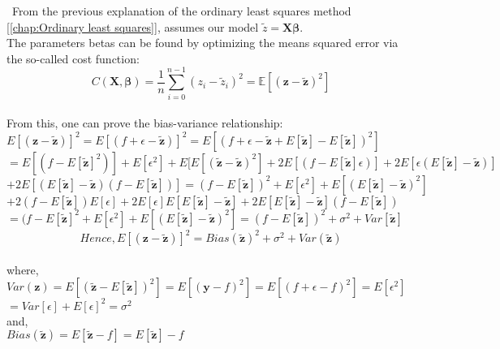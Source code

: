 \quad \, From the previous explanation of the ordinary least squares method [\ref{chap:Ordinary least squares}], assumes our model $\tilde{z} = \textbf{X}\boldsymbol{\beta}$. \\

The parameters betas can be found by optimizing the means squared error via the so-called cost function: \\

$$C(\boldsymbol{X},\boldsymbol{\beta}) =\frac{1}{n}\sum_{i=0}^{n-1}(z_i-\tilde{z}_i)^2=\mathbb{E}\left[(\boldsymbol{z}-\boldsymbol{\tilde{z}})^2\right]$$ \\

From this, one can prove the bias-variance relationship: \\

$E[(\boldsymbol{z} - \boldsymbol{\tilde{z}})]^{2} = E[(f + \epsilon - \boldsymbol{\tilde{z}})]^{2} = E[(f + \epsilon - \boldsymbol{\tilde{z}} + E[\boldsymbol{\tilde{z}}] - E[\boldsymbol{\tilde{z}}])^{2}]$ \\

$= E[(f - E[\boldsymbol{\tilde{z}}]^{2})] + E[\epsilon^{2}] + E[E[(\boldsymbol{\tilde{z}} - \boldsymbol{\tilde{z}})^{2}] + 
2E[(f - E[\boldsymbol{\tilde{z}}] \epsilon)] + 2E[\epsilon(E[\boldsymbol{\tilde{z}}] - \boldsymbol{\tilde{z}})]$ \\

$+ 2E[(E[\boldsymbol{\tilde{z}}] - \boldsymbol{\tilde{z}})(f-E[\boldsymbol{\tilde{z}}])] = (f - E[\boldsymbol{\tilde{z}}])^{2} + E[\epsilon^{2}] + E[(E[\boldsymbol{\tilde{z}}] - \boldsymbol{\tilde{z}})^{2}]$ \\

$+ 2(f-E[\boldsymbol{\tilde{z}}])E[\epsilon] + 2E[\epsilon]E[E[\boldsymbol{\tilde{z}}]-\boldsymbol{\tilde{z}}] + 2E[E[\boldsymbol{\tilde{z}}]-\boldsymbol{\tilde{z}}](f-E[\boldsymbol{\tilde{z}}])$ \\

$= (f-E[\boldsymbol{\tilde{z}}]^{2} + E[\epsilon^{2}]+E[(E[\boldsymbol{\tilde{z}}]-\boldsymbol{\tilde{z}})^{2}] = (f-E[\boldsymbol{\tilde{z}}])^{2}+\sigma^{2}+Var[\boldsymbol{\tilde{z}}]$ \\

\begin{equation}
\label{bias-variance-decomposition}
Hence, E[(\boldsymbol{z} - \boldsymbol{\tilde{z}})]^{2} = Bias(\boldsymbol{\tilde{z}})^{2} + \sigma^{2} + Var(\boldsymbol{\tilde{z}})
\end{equation} \\

\noindent where, \\

$Var(\textbf{z}) = E[(\boldsymbol{\tilde{z}}-E[\boldsymbol{\tilde{z}}])^{2}] = E[(\textbf{y}-f)^{2}] = E[(f+\epsilon-f)^{2}]=E[\epsilon^{2}]$ \\

$=Var[\epsilon]+E[\epsilon]^{2} = \sigma^{2}$ \\

\noindent and, \\

$Bias(\boldsymbol{\tilde{z}}) = E[\boldsymbol{\tilde{z}}-f]=E[\boldsymbol{\tilde{z}}]-f $ \\

